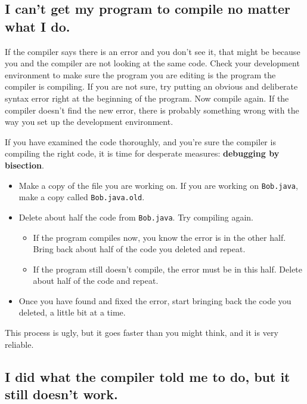 \documentclass[12pt]{book}
\theoremstyle{exercise}
\begin{document}
\subsection*{I can't get my program to compile no matter
what I do.}

If the compiler says there is an error and you don't see it, that
might be because you and the compiler are not looking at the same
code.  Check your development environment to make sure the program
you are editing is the program the compiler is compiling.  If you
are not sure, try putting an obvious and deliberate syntax error
right at the beginning of the program.  Now compile again.  If
the compiler doesn't find the new error, there is probably something
wrong with the way you set up the development environment.

If you have examined the code thoroughly, and you're sure the compiler
is compiling the right code, it is time for desperate measures:
{\bf debugging by bisection}.

\begin{itemize}

\item Make a copy of the file you are working on.  If you are
working on {\tt Bob.java}, make a copy called {\tt Bob.java.old}.

\item Delete about half the code from {\tt Bob.java}.  Try compiling
again.

\begin{itemize}

\item If the program compiles now, you know the error is in
the other half.  Bring back about half of the code you deleted and
repeat.

\item If the program still doesn't compile, the error must be in
this half.  Delete about half of the code and repeat.

\end{itemize}

\item Once you have found and fixed the error, start bringing back
the code you deleted, a little bit at a time.

\end{itemize}

This process is ugly, but it goes faster than you might think,
and it is very reliable.


\subsection*{I did what the compiler told me to do, but it
still doesn't work.}
\end{document}
